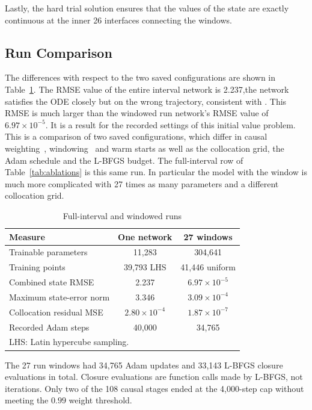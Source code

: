 \documentclass[conference,a4paper]{IEEEtran}
\begin{document}
Lastly, the hard trial solution ensures that the values of the state are exactly continuous at the inner 26 interfaces connecting the windows.


\subsection{Run Comparison}
The differences with respect to the two saved configurations are shown in Table~\ref{tab:comparison}. The RMSE value of the entire interval network is 2.237,the network satisfies the ODE closely but on the wrong trajectory, consistent with \cite{rohrhofer2023}. This RMSE is much larger than the windowed run network's RMSE value of $6.97\times10^{-5}$. It is a result for the recorded settings of this initial value problem. This is a comparison of two saved configurations, which differ in causal weighting~\cite{wang2024causal}, windowing~\cite{penwarden2023} and warm starts as well as the collocation grid, the Adam schedule and the L-BFGS budget. The full-interval row of Table~\ref{tab:ablations} is this same run. In particular the model with the window is much more complicated with 27 times as many parameters and a different collocation grid.

\begin{table}[t]
\caption{Full-interval and windowed runs}
\label{tab:comparison}
\centering\footnotesize
\begin{tabular}{lcc}
\toprule
Measure & One network & 27 windows\\
\midrule
Trainable parameters & 11,283 & 304,641\\
Training points & 39,793 LHS & 41,446 uniform\\
Combined state RMSE & 2.237 & $6.97\times10^{-5}$\\
Maximum state-error norm & 3.346 & $3.09\times10^{-4}$\\
Collocation residual MSE & $2.80\times10^{-4}$ & $1.87\times10^{-7}$\\
Recorded Adam steps & 40,000 & 34,765\\
\bottomrule
\multicolumn{3}{l}{LHS: Latin hypercube sampling.}\\
\end{tabular}
\end{table}

The 27 run windows had 34,765 Adam updates and 33,143 L-BFGS closure evaluations in total. Closure evaluations are function calls made by L-BFGS, not iterations. Only two of the 108 causal stages ended at the 4,000-step cap without meeting the $0.99$ weight threshold.
\end{document}
